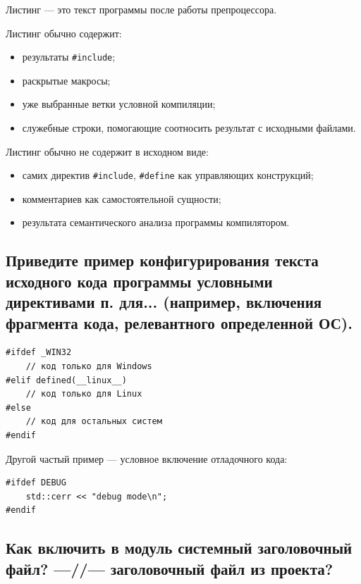 \begin{definition}[Листинг]
Листинг --- это текст программы после работы препроцессора.
\end{definition}

Листинг обычно содержит:
\begin{itemize}
    \item результаты \texttt{\#include};
    \item раскрытые макросы;
    \item уже выбранные ветки условной компиляции;
    \item служебные строки, помогающие соотносить результат с исходными файлами.
\end{itemize}

Листинг обычно не содержит в исходном виде:
\begin{itemize}
    \item самих директив \texttt{\#include}, \texttt{\#define} как управляющих конструкций;
    \item комментариев как самостоятельной сущности;
    \item результата семантического анализа программы компилятором.
\end{itemize}


\subsection{Приведите пример конфигурирования текста исходного кода программы условными директивами п. для... (например, включения фрагмента кода, релевантного определенной ОС).}

\begin{example}
\begin{verbatim}
#ifdef _WIN32
    // код только для Windows
#elif defined(__linux__)
    // код только для Linux
#else
    // код для остальных систем
#endif
\end{verbatim}
\end{example}

Другой частый пример --- условное включение отладочного кода:
\begin{verbatim}
#ifdef DEBUG
    std::cerr << "debug mode\n";
#endif
\end{verbatim}


\subsection{Как включить в модуль системный заголовочный файл? ---//--- заголовочный файл из проекта?}

